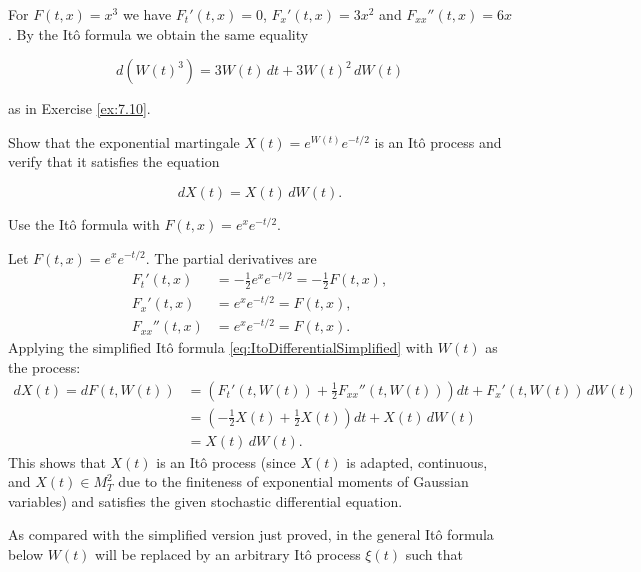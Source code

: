 \begin{Example}
\label{ex:7-ito-formula-cubic}
For $F(t, x) = x^3$ we have $F_t'(t, x) = 0$, $F_x'(t, x) = 3x^2$ and $F_{xx}''(t, x) = 6x$. By the Itô formula we obtain the same equality

\begin{equation}
d\left(W(t)^3\right) = 3W(t) \, dt + 3W(t)^2 \, dW(t)
\end{equation}

as in Exercise \ref{ex:7.10}.
\end{Example}

\begin{Exercise}
\label{ex:7.14}
Show that the exponential martingale $X(t) = e^{W(t)} e^{-t/2}$ is an Itô process and verify that it satisfies the equation

\begin{equation}
dX(t) = X(t) \, dW(t).
\end{equation}

\begin{hint}
Use the Itô formula with $F(t, x) = e^x e^{-t/2}$.
\end{hint}
\end{Exercise}

\begin{Solution}
Let $F(t, x) = e^x e^{-t/2}$. The partial derivatives are
\begin{align*}
F_t'(t, x) &= -\frac{1}{2} e^x e^{-t/2} = -\frac{1}{2} F(t, x), \\
F_x'(t, x) &= e^x e^{-t/2} = F(t, x), \\
F_{xx}''(t, x) &= e^x e^{-t/2} = F(t, x).
\end{align*}
Applying the simplified Itô formula \eqref{eq:ItoDifferentialSimplified} with $W(t)$ as the process:
\begin{align*}
dX(t) = dF(t, W(t)) &= \left( F_t'(t, W(t)) + \frac{1}{2} F_{xx}''(t, W(t)) \right) dt + F_x'(t, W(t)) \, dW(t) \\
&= \left( -\frac{1}{2} X(t) + \frac{1}{2} X(t) \right) dt + X(t) \, dW(t) \\
&= X(t) \, dW(t).
\end{align*}
This shows that $X(t)$ is an Itô process (since $X(t)$ is adapted, continuous, and $X(t) \in M_T^2$ due to the finiteness of exponential moments of Gaussian variables) and satisfies the given stochastic differential equation.
\end{Solution}

As compared with the simplified version just proved, in the general Itô formula below $W(t)$ will be replaced by an arbitrary Itô process $\xi(t)$ such that

